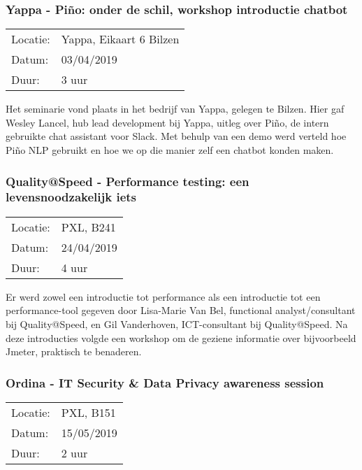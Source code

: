 \subsubsection{Yappa - Piño: onder de schil, workshop introductie chatbot}

\begin{tabular}{l l}
  Locatie: & Yappa, Eikaart 6 Bilzen\\
  Datum: & 03/04/2019\\
  Duur: & 3 uur
\end{tabular}

Het seminarie vond plaats in het bedrijf van Yappa, gelegen te Bilzen. Hier gaf Wesley Lancel, hub lead development bij Yappa, uitleg over Piño, de intern gebruikte chat assistant voor Slack. Met behulp van een demo werd verteld hoe Piño NLP gebruikt en hoe we op die manier zelf een chatbot konden maken.

\subsubsection{Quality@Speed - Performance testing: een levensnoodzakelijk iets}

\begin{tabular}{l l}
  Locatie: & PXL, B241\\
  Datum: & 24/04/2019\\
  Duur: & 4 uur
\end{tabular}

Er werd zowel een introductie tot performance als een introductie tot een performance\hyp{}tool gegeven door Lisa\hyp{}Marie Van Bel, functional analyst/consultant bij Quality@Speed, en Gil Vanderhoven, ICT\hyp{}consultant bij Quality@Speed. Na deze introducties volgde een workshop om de geziene informatie over bijvoorbeeld Jmeter, praktisch te benaderen.

\subsubsection{Ordina - IT Security \& Data Privacy awareness session}

\begin{tabular}{l l}
  Locatie: & PXL, B151\\
  Datum: & 15/05/2019\\
  Duur: & 2 uur
\end{tabular}

